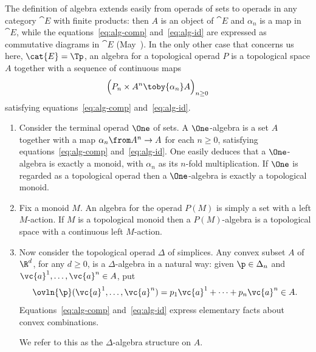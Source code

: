 The definition of algebra extends easily from operads of sets to operads in
any category $\cat{E}$ with finite products: then $A$ is an object of
$\cat{E}$ and $\alpha_n$ is a map in $\cat{E}$, while the
equations~\eqref{eq:alg-comp} and~\eqref{eq:alg-id} are expressed as
commutative diagrams in $\cat{E}$ (May~\cite{MayDOA}).  In the only other
case that concerns us here, $\cat{E} = \Tp$, an algebra%
%
%
% 
for a topological operad $P$ is a topological space $A$ together with a
sequence of continuous maps
\[
\Bigl( P_n \times A^n \toby{\alpha_n} A \Bigr)_{n \geq 0}
\]
satisfying equations~\eqref{eq:alg-comp} and~\eqref{eq:alg-id}.

\begin{examples}
\begin{enumerate}
\item
{} 
Consider the terminal%
% 
%
% 
operad $\One$ of sets.  A $\One$-algebra is a set $A$ together with a map
$\alpha_n \from A^n \to A$ for each $n \geq 0$, satisfying
equations~\eqref{eq:alg-comp} and~\eqref{eq:alg-id}.  One easily deduces
that a $\One$-algebra is exactly a monoid, with $\alpha_n$ as its $n$-fold
multiplication.  If $\One$ is regarded as a topological operad then a
$\One$-algebra is exactly a topological monoid.

\item
Fix a monoid%
%
%
% 
$M$.  An algebra for the operad $P(M)$ is simply a set with a
left $M$-action.  If $M$ is a topological monoid then a $P(M)$-algebra is a
topological space with a continuous left $M$-action.

\item
{}
Now consider the topological operad $\Delta$ of simplices.%
%
%
%
% 
Any convex subset $A$ of $\R^d$, for any $d \geq 0$, is a $\Delta$-algebra
in a natural way: given $\p \in \Delta_n$ and $\vc{a}^1, \ldots, \vc{a}^n
\in A$, put
\[
\ovln{\p}(\vc{a}^1, \ldots, \vc{a}^n)
=
p_1 \vc{a}^1 + \cdots + p_n \vc{a}^n
\in 
A.
\]
Equations~\eqref{eq:alg-comp} and~\eqref{eq:alg-id} express elementary
facts about convex combinations.  

We refer to this as the %
%
% 
$\Delta$-algebra structure on $A$.


\end{enumerate}
\end{examples}
